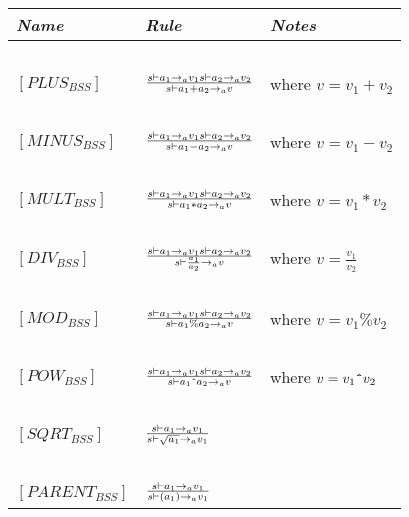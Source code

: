 \begin{table}[h]
	\begin{tabular}{|l|l|l|}
	\hline
	\emph{Name}			& \emph{Rule}																															& \emph{Notes} \\ \hline
			~			&															~																			& ~ \\
	$[PLUS_{BSS}]$		& $s \vdash a_{1} \rightarrow_{a} v_{1}  s \vdash a_{2} \rightarrow_{a} v_{2} \over s \vdash a_{1}+a_{2} \rightarrow_{a} v$ 			& where $v = v_{1}+v_{2}$ \\
			~			&															~																			& ~ \\
	$[MINUS_{BSS}]$		& $s \vdash a_{1} \rightarrow_{a} v_{1}  s \vdash a_{2} \rightarrow_{a} v_{2} \over s \vdash a_{1}-a_{2} \rightarrow_{a} v$ 			& where $v = v_{1}-v_{2}$ \\
			~			&															~																			& ~ \\
	$[MULT_{BSS}]$		& $s \vdash a_{1} \rightarrow_{a} v_{1}  s \vdash a_{2} \rightarrow_{a} v_{2} \over s \vdash a_{1}*a_{2} \rightarrow_{a} v$ 			& where $v = v_{1}*v_{2}$ \\
			~			&															~																			& ~ \\
	$[DIV_{BSS}]$		& $s \vdash a_{1} \rightarrow_{a} v_{1}  s \vdash a_{2} \rightarrow_{a} v_{2} \over s \vdash \frac{a_{1}}{a_{2}} \rightarrow_{a} v$ 	& where $v = \frac{v_{1}}{v_{2}}$ \\
			~			&																																		& ~ \\
	$[MOD_{BSS}]$		& $s \vdash a_{1} \rightarrow_{a} v_{1}  s \vdash a_{2} \rightarrow_{a} v_{2} \over s \vdash a_{1}\%a_{2} \rightarrow_{a} v$			& where $v = v_{1}\%v_{2}$ \\
			~			&															~																			& ~ \\
	$[POW_{BSS}]$		& $s \vdash a_{1} \rightarrow_{a} v_{1}  s \vdash a_{2} \rightarrow_{a} v_{2} \over s \vdash a_{1}\texttt{\^{}}a_{2} \rightarrow_{a} v$	& where $v = v_{1}\texttt{\^{}}v_{2}$ \\
			~			&															~																			& ~ \\
	$[SQRT_{BSS}]$		& $s \vdash a_{1} \rightarrow_{a} v_{1} \over s \vdash \sqrt{a_{1}} \rightarrow_{a} v_{1}$												& ~ \\
			~			&															~																			& ~ \\
	$[PARENT_{BSS}]$	& $s \vdash a_{1} \rightarrow_{a} v_{1} \over s \vdash (a_{1}) \rightarrow_{a} v_{1}$													& ~ \\

\end{tabular}
\end{table}

